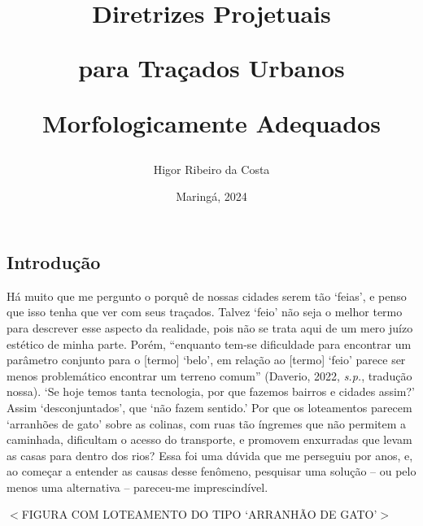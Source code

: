 \documentclass[12pt, a4paper]{book} %
\begin{document}
\frontmatter %

\title{Diretrizes Projetuais 

para Traçados Urbanos

Morfologicamente Adequados}

\author{Higor Ribeiro da Costa}
\date{Maringá, 2024}

    \maketitle

    \tableofcontents
    \listoffigures %
    \listoftables %


    \mainmatter %

    \onehalfspacing
    

    \part*{}

        \chapter*{Introdução}
        
        Há muito que me pergunto o porquê de nossas cidades serem tão `feias', e penso que isso tenha que ver com seus traçados. Talvez `feio' não seja o melhor termo para descrever esse aspecto da realidade, pois não se trata aqui de um mero juízo estético de minha parte. Porém, ``enquanto tem-se dificuldade para encontrar um parâmetro conjunto para o [termo] `belo', em relação ao [termo] `feio' parece ser menos problemático encontrar um terreno comum'' (Daverio, 2022, \textit{s.p.}, tradução nossa). `Se hoje temos tanta tecnologia, por que fazemos bairros e cidades assim?' Assim `desconjuntados', que `não fazem sentido.' Por que os loteamentos parecem `arranhões de gato' sobre as colinas, com ruas tão íngremes que não permitem a caminhada, dificultam o acesso do transporte, e promovem enxurradas que levam as casas para dentro dos rios? Essa foi uma dúvida que me perseguiu por anos, e, ao começar a entender as causas desse fenômeno, pesquisar uma solução – ou pelo menos uma alternativa – pareceu-me imprescindível.

        $<$FIGURA COM LOTEAMENTO DO TIPO `ARRANHÃO DE GATO'$>$
\end{document}
